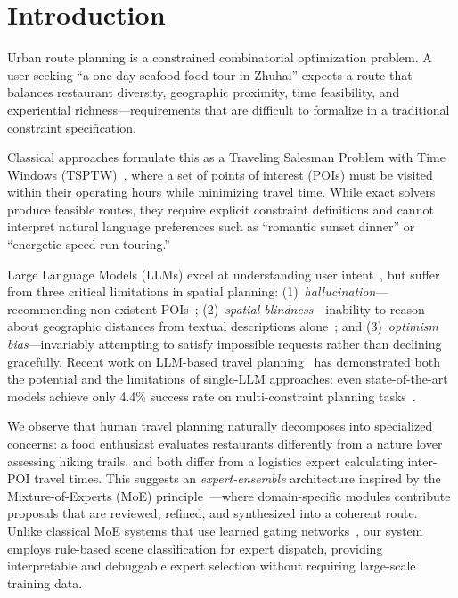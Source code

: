 \section{Introduction}
\label{sec:introduction}

Urban route planning is a constrained combinatorial optimization problem. A user seeking ``a one-day seafood food tour in Zhuhai'' expects a route that balances restaurant diversity, geographic proximity, time feasibility, and experiential richness---requirements that are difficult to formalize in a traditional constraint specification.

Classical approaches formulate this as a Traveling Salesman Problem with Time Windows (TSPTW)~\cite{solomon1987algorithms}, where a set of points of interest (POIs) must be visited within their operating hours while minimizing travel time. While exact solvers produce feasible routes, they require explicit constraint definitions and cannot interpret natural language preferences such as ``romantic sunset dinner'' or ``energetic speed-run touring.''

Large Language Models (LLMs) excel at understanding user intent~\cite{wei2022chain}, but suffer from three critical limitations in spatial planning: (1)~\textit{hallucination}---recommending non-existent POIs~\cite{ji2023survey}; (2)~\textit{spatial blindness}---inability to reason about geographic distances from textual descriptions alone~\cite{zhang2025spatial}; and (3)~\textit{optimism bias}---invariably attempting to satisfy impossible requests rather than declining gracefully. Recent work on LLM-based travel planning~\cite{chen2024travelagent,xie2024travelplanner} has demonstrated both the potential and the limitations of single-LLM approaches: even state-of-the-art models achieve only 4.4\% success rate on multi-constraint planning tasks~\cite{xie2024travelplanner}.

We observe that human travel planning naturally decomposes into specialized concerns: a food enthusiast evaluates restaurants differently from a nature lover assessing hiking trails, and both differ from a logistics expert calculating inter-POI travel times. This suggests an \textit{expert-ensemble} architecture inspired by the Mixture-of-Experts (MoE) principle~\cite{shazeer2017outrageously,jiang2024mixtral}---where domain-specific modules contribute proposals that are reviewed, refined, and synthesized into a coherent route. Unlike classical MoE systems that use learned gating networks~\cite{fedus2022switch}, our system employs rule-based scene classification for expert dispatch, providing interpretable and debuggable expert selection without requiring large-scale training data.

